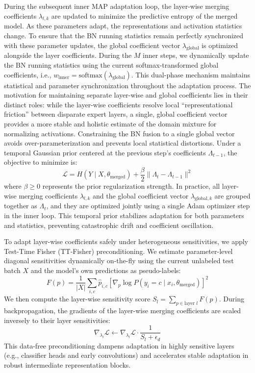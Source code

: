 \documentclass{article}
\theoremstyle{plain}
\theoremstyle{definition}
\theoremstyle{remark}
\begin{document}
During the subsequent inner MAP adaptation loop, the layer-wise merging coefficients
$\lambda_{l,k}$ are updated to minimize the predictive entropy of the merged model. As these
parameters adapt, the representations and activation statistics change. To ensure that the BN
running statistics remain perfectly synchronized with these parameter updates, the global
coefficient vector $\lambda_{\text{global}}$ is optimized alongside the layer coefficients. During
the $M$ inner steps, we dynamically update the BN running statistics using the current
softmax-transformed global coefficients, i.e., $w_{\text{inner}} =
\text{softmax}(\lambda_{\text{global}})$. This dual-phase mechanism maintains statistical and
parameter synchronization throughout the adaptation process. The motivation for maintaining separate
layer-wise and global coefficients lies in their distinct roles: while the layer-wise coefficients
resolve local ``representational friction'' between disparate expert layers, a single, global
coefficient vector provides a more stable and holistic estimate of the domain mixture for
normalizing activations. Constraining the BN fusion to a single global vector avoids
over-parameterization and prevents local statistical distortions. Under a temporal Gaussian prior
centered at the previous step's coefficients $\Lambda_{t-1}$, the objective to minimize is:
\begin{equation}
\mathcal{L} = H(Y \mid X, \theta_{\text{merged}}) + \frac{\beta}{2} \|\Lambda_t - \Lambda_{t-1}\|^2
\end{equation}
where $\beta \ge 0$ represents the prior regularization strength. In practice, all layer-wise
merging coefficients $\lambda_{l,k}$ and the global coefficient vector $\lambda_{\text{global},k}$
are grouped together as $\Lambda_t$, and they are optimized jointly using a single Adam optimizer
step in the inner loop. This temporal prior stabilizes adaptation for both parameters and
statistics, preventing catastrophic drift and coefficient oscillation.

To adapt layer-wise coefficients safely under heterogeneous sensitivities, we apply Test-Time
Fisher (TT-Fisher) preconditioning. We estimate parameter-level diagonal sensitivities dynamically
on-the-fly using the current unlabeled test batch $X$ and the model's own predictions as
pseudo-labels:
\begin{equation}
F(p) = \frac{1}{|X|} \sum_{i, c} \hat{p}_{i,c} \left[ \nabla_p \log P(y_i = c \mid x_i,
\theta_{\text{merged}}) \right]^2
\end{equation}
We then compute the layer-wise sensitivity score $S_l = \sum_{p \in \text{layer } l} F(p)$. During
backpropagation, the gradients of the layer-wise merging coefficients are scaled inversely to their
layer sensitivities:
\begin{equation}
\nabla_{\lambda_{l}} \mathcal{L} \leftarrow \nabla_{\lambda_{l}} \mathcal{L} \cdot \frac{1}{S_l +
\epsilon_d}
\end{equation}
This data-free preconditioning dampens adaptation in highly sensitive layers (e.g., classifier
heads and early convolutions) and accelerates stable adaptation in robust intermediate
representation blocks.
\end{document}
